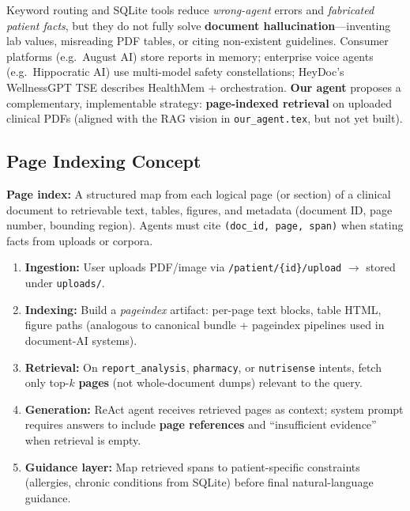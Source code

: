 \documentclass[12pt,a4paper]{article}
\begin{document}
Keyword routing and SQLite tools reduce \emph{wrong-agent} errors and \emph{fabricated patient facts}, but they do not fully solve \textbf{document hallucination}---inventing lab values, misreading PDF tables, or citing non-existent guidelines. Consumer platforms (e.g.\ August AI) store reports in memory; enterprise voice agents (e.g.\ Hippocratic AI) use multi-model safety constellations; HeyDoc's WellnessGPT TSE describes HealthMem + orchestration. \textbf{Our agent} proposes a complementary, implementable strategy: \textbf{page-indexed retrieval} on uploaded clinical PDFs (aligned with the RAG vision in \texttt{our\_agent.tex}, but not yet built).

\subsection{Page Indexing Concept}

\begin{mdframed}[backgroundcolor=lightgray, linecolor=accentteal, linewidth=1pt]
\textbf{Page index:} A structured map from each logical page (or section) of a clinical document to retrievable text, tables, figures, and metadata (document ID, page number, bounding region). Agents must cite \texttt{(doc\_id, page, span)} when stating facts from uploads or corpora.
\end{mdframed}

\begin{enumerate}[leftmargin=*]
    \item \textbf{Ingestion:} User uploads PDF/image via \texttt{/patient/\{id\}/upload} $\rightarrow$ stored under \texttt{uploads/}.
    \item \textbf{Indexing:} Build a \emph{pageindex} artifact: per-page text blocks, table HTML, figure paths (analogous to canonical bundle + pageindex pipelines used in document-AI systems).
    \item \textbf{Retrieval:} On \texttt{report\_analysis}, \texttt{pharmacy}, or \texttt{nutrisense} intents, fetch only top-$k$ \textbf{pages} (not whole-document dumps) relevant to the query.
    \item \textbf{Generation:} ReAct agent receives retrieved pages as context; system prompt requires answers to include \textbf{page references} and ``insufficient evidence'' when retrieval is empty.
    \item \textbf{Guidance layer:} Map retrieved spans to patient-specific constraints (allergies, chronic conditions from SQLite) before final natural-language guidance.
\end{enumerate}
\end{document}

